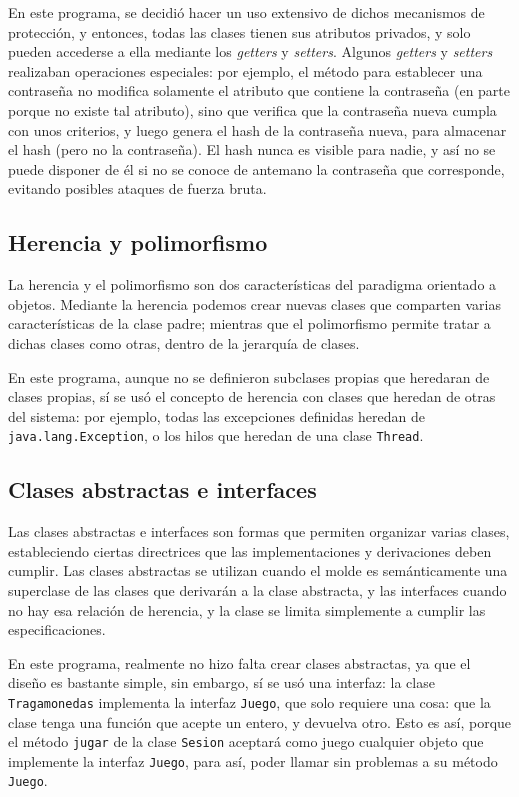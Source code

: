 \documentclass[letterpaper,12pt]{article}
\begin{document}
En este programa, se decidió hacer un uso extensivo de dichos mecanismos de protección, y entonces, todas las clases tienen sus atributos privados, y solo pueden accederse a ella mediante los \emph{getters} y \emph{setters}. Algunos \emph{getters} y \emph{setters} realizaban operaciones especiales: por ejemplo, el método para establecer una contraseña no modifica solamente el atributo que contiene la contraseña (en parte porque no existe tal atributo), sino que verifica que la contraseña nueva cumpla con unos criterios, y luego genera el hash de la contraseña nueva, para almacenar el hash (pero no la contraseña). El hash nunca es visible para nadie, y así no se puede disponer de él si no se conoce de antemano la contraseña que corresponde, evitando posibles ataques de fuerza bruta.

\subsection{Herencia y polimorfismo}
La herencia y el polimorfismo son dos características del paradigma orientado a objetos. Mediante la herencia podemos crear nuevas clases que comparten varias características de la clase padre; mientras que el polimorfismo permite tratar a dichas clases como otras, dentro de la jerarquía de clases.

En este programa, aunque no se definieron subclases propias que heredaran de clases propias, sí se usó el concepto de herencia con clases que heredan de otras del sistema: por ejemplo, todas las excepciones definidas heredan de \texttt{java.lang.Exception}, o los hilos que heredan de una clase \texttt{Thread}.


\subsection{Clases abstractas e interfaces}
Las clases abstractas e interfaces son formas que permiten organizar varias clases, estableciendo ciertas directrices que las implementaciones y derivaciones deben cumplir. Las clases abstractas se utilizan cuando el molde es semánticamente una superclase de las clases que derivarán a la clase abstracta, y las interfaces cuando no hay esa relación de herencia, y la clase se limita simplemente a cumplir las especificaciones.

En este programa, realmente no hizo falta crear clases abstractas, ya que el diseño es bastante simple, sin embargo, sí se usó una interfaz: la clase \texttt{Tragamonedas} implementa la interfaz \texttt{Juego}, que solo requiere una cosa: que la clase tenga una función que acepte un entero, y devuelva otro. Esto es así, porque el método \texttt{jugar} de la clase \texttt{Sesion} aceptará como juego cualquier objeto que implemente la interfaz \texttt{Juego}, para así, poder llamar sin problemas a su método \texttt{Juego}.
\end{document}
